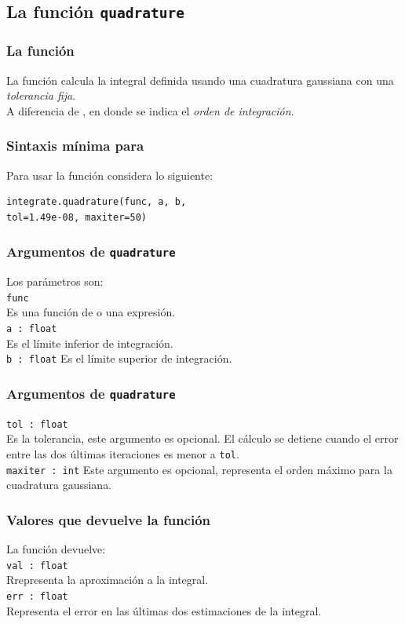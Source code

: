 \subsection*{La función \texttt{quadrature}}
\begin{frame}
\frametitle{La función }
La función  calcula la integral definida usando una cuadratura gaussiana con una \emph{tolerancia fija}.
\\
\bigskip
A diferencia de , en donde se indica el \emph{orden de integración.}
\end{frame}
\begin{frame}[fragile]
\frametitle{Sintaxis mínima para }
Para usar la función  considera lo siguiente:
\begin{verbatim}
integrate.quadrature(func, a, b, 
tol=1.49e-08, maxiter=50)
\end{verbatim}
\end{frame}
\begin{frame}[fragile]
\frametitle{Argumentos de \texttt{quadrature}}
Los parámetros son:
\\
\medskip
\verb|func|
\\
Es una función de \python{} o una expresión.
\\
\medskip
\verb|a : float|
\\
Es el límite inferior de integración.
\\
\medskip
\verb|b : float|
Es el límite superior de integración.
\end{frame}
\begin{frame}[fragile]
\frametitle{Argumentos de \texttt{quadrature}}
\verb|tol : float|
\\
Es la tolerancia, este argumento es opcional. El cálculo se detiene cuando el error entre las dos últimas iteraciones es menor a \texttt{tol}.
\\
\medskip
\verb|maxiter : int|
Este argumento es opcional, representa el orden máximo para la cuadratura gaussiana.
\end{frame}
\begin{frame}[fragile]
\frametitle{Valores que devuelve la función}
La función devuelve:
\\
\medskip
\verb|val : float|
\\
Rrepresenta la aproximación a la integral.
\\
\medskip
\verb|err : float|
\\
Representa el error en las últimas dos estimaciones de la integral.
\end{frame}
